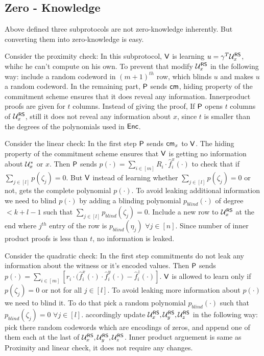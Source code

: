 \subsection{Zero - Knowledge}
Above defined three subprotocols are not zero-knowledge inherently. But converting them into zero-knowledge is easy. 

Consider the proximity check: In this subprotocol, $\mathsf{V}$ is learning $u = \gamma^T\mathcal{U}^{\mathsf{RS}}_{x}$, whihc he can't compute on his own. To prevent that modify $\mathcal{U}^{\mathsf{RS}}_{x}$ in the following way: include a random codeword in $(m+1)^{th}$ row, which blinds $u$ and makes $u$ a random codeword. 
In the remaining part, $\mathsf{P}$ sends $\mathsf{cm}$, hiding property of the commitment scheme ensures that it does reveal any information.
Innerproduct proofs are given for $t$ columns. Instead of giving the proof, If $\mathsf{P}$ opens $t$ columns of $\mathcal{U}^{\mathsf{RS}}_{x}$, still it does not reveal any information about $x$, since $t$ is smaller than the degrees of the polynomials used in $\mathsf{Enc}$.

Consider the linear check: In the first step $\mathsf{P}$ sends $\mathsf{cm}_x$ to $\mathsf{V}$. The hiding property of the commitment scheme ensures that $\mathsf{V}$ is getting no information about $\mathcal{U}^*_x$ or $x$.
Then $\mathsf{P}$ sends $p(\cdot) = \sum_{i\in[m]} R_i \cdot \hat{f}^x_i(\cdot)$ to check that if $\sum_{j\in [l]} p(\zeta_j) = 0$. But $\mathsf{V}$ instead of learning whether $\sum_{j\in[l]} p(\zeta_j) = 0$ or not, gets the complete polynomial $p(\cdot)$. To avoid leaking additional information we need to blind $p(\cdot)$ by adding a blinding polynomial $p_{blind}(\cdot)$ of degree $< k + l - 1$ such that $\sum_{j\in[l]} p_{blind}(\zeta_j) = 0$. Include a new row to $\mathcal{U}^{\mathsf{RS}}_x$ at the end where $j^{th}$ entry of the row is $p_{blind}(\eta_j)$ $\forall j\in [n]$.
Since number of inner product proofs is less than $t$, no information is leaked.

Consider the quadratic check: In the first step commitments do not leak any information about the witness or it's encoded values.
Then $\mathsf{P}$ sends $p(\cdot) = \sum_{i\in[m]} [r_i\cdot (\hat{f}^x_i(\cdot)\cdot \hat{f}^y_i(\cdot) - \hat{f}^z_i(\cdot)]$. $\mathsf{V}$ is allowed to learn only if $p(\zeta_j)=0$ or not for all $j\in[l]$. To avoid leaking more information about $p(\cdot)$ we need to blind it. To do that pick a random polynomial $p_{blind}(\cdot)$ such that $p_{blind}(\zeta_j) = 0$ $\forall j\in [l]$. accordingly update $\mathcal{U}^{\mathsf{RS}}_x, \mathcal{U}^{\mathsf{RS}}_y,\mathcal{U}^{\mathsf{RS}}_z$ in the following way: pick there random codewords which are encodings of zeros, and append one of them each at the last of $\mathcal{U}^{\mathsf{RS}}_{x}, \mathcal{U}^{\mathsf{RS}}_{y}, \mathcal{U}^{\mathsf{RS}}_{z}$.
Inner product arguement is same as Proximity and linear check, it does not require any changes. 

